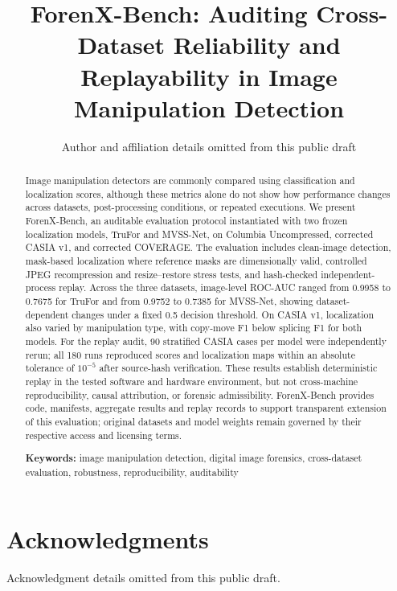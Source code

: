 \documentclass[11pt,a4paper]{article}
\title{\textbf{ForenX-Bench: Auditing Cross-Dataset Reliability and Replayability in Image Manipulation Detection}}
\author{Author and affiliation details omitted from this public draft}
\date{}
\begin{document}
\maketitle

\begin{abstract}
Image manipulation detectors are commonly compared using classification and localization scores, although these metrics alone do not show how performance changes across datasets, post-processing conditions, or repeated executions. We present ForenX-Bench, an auditable evaluation protocol instantiated with two frozen localization models, TruFor and MVSS-Net, on Columbia Uncompressed, corrected CASIA v1, and corrected COVERAGE. The evaluation includes clean-image detection, mask-based localization where reference masks are dimensionally valid, controlled JPEG recompression and resize--restore stress tests, and hash-checked independent-process replay. Across the three datasets, image-level ROC-AUC ranged from 0.9958 to 0.7675 for TruFor and from 0.9752 to 0.7385 for MVSS-Net, showing dataset-dependent changes under a fixed 0.5 decision threshold. On CASIA v1, localization also varied by manipulation type, with copy-move F1 below splicing F1 for both models. For the replay audit, 90 stratified CASIA cases per model were independently rerun; all 180 runs reproduced scores and localization maps within an absolute tolerance of $10^{-5}$ after source-hash verification. These results establish deterministic replay in the tested software and hardware environment, but not cross-machine reproducibility, causal attribution, or forensic admissibility. ForenX-Bench provides code, manifests, aggregate results and replay records to support transparent extension of this evaluation; original datasets and model weights remain governed by their respective access and licensing terms.

\vspace{0.3em}
\noindent\textbf{Keywords:} image manipulation detection, digital image forensics, cross-dataset evaluation, robustness, reproducibility, auditability
\end{abstract}











\section*{Acknowledgments}
Acknowledgment details omitted from this public draft.



\end{document}
